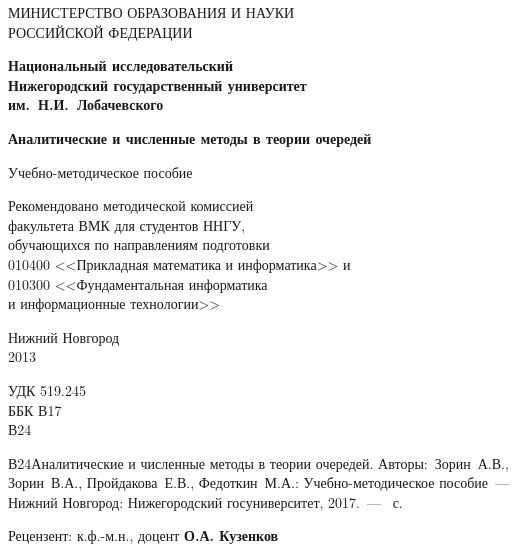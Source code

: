 \documentclass[10pt,oneside,final]{book}
\begin{document}
\begin{titlepage}
  \begin{center}
    МИНИСТЕРСТВО ОБРАЗОВАНИЯ И НАУКИ 
    \\ РОССИЙСКОЙ ФЕДЕРАЦИИ
    
    \medskip
    
    {\textbf{Национальный исследовательский 
        \\ Нижегородский  государственный университет 
        \\  им.~Н.И.~Лобачевского}} 
    
    
    \vfill 
    
    \large \textbf{\Large Аналитические и численные методы в теории очередей}
    
    \bigskip
    
    Учебно-методическое пособие
    
    \bigskip
    
    Рекомендовано методической комиссией 
    \\факультета ВМК для студентов ННГУ, 
    \\ обучающихся по направлениям подготовки 
    \\ 010400 <<Прикладная
    математика и информатика>> и 
    \\ 010300 <<Фундаментальная информатика
    \\ и информационные технологии>> \vfill
    
    Нижний Новгород \\ 2013
  \end{center}
  
\end{titlepage}

\addtocounter{page}{1}
\thispagestyle{empty}
\indent УДК 519.245\\
\indent ББК В17\\
\indent\phantom{ББК }В24

\vspace{1cm}

В24\quad Аналитические и численные методы в теории очередей. Авторы:~Зорин~А.В.,
Зорин~В.А., Пройдакова~Е.В., Федоткин~М.А.: Учебно-методическое
пособие~--- Нижний Новгород:
 Нижегородский госуниверситет, 2017.~---
\pageref{p:thelast}~с.

\bigskip

Рецензент: к.ф.-м.н., доцент \textbf{О.А. Кузенков}

\vfill

\end{document}
